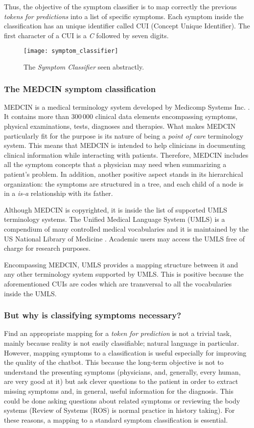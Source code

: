 Thus, the objective of the symptom classifier is to map correctly the previous \textit{tokens for predictions} into a list of specific symptoms. Each symptom inside the classification has an unique identifier called CUI (Concept Unique Identifier). The first character of a CUI is a \textit{C} followed by seven digits.

\begin{figure}[h]
\centering
\texttt{[image: symptom\_classifier]}
\caption{The \textit{Symptom Classifier} seen abstractly.}
\medskip
\end{figure}

\subsubsection{The MEDCIN symptom classification}
MEDCIN is a medical terminology system developed by Medicomp Systems Inc. \cite{medcin}. It contains more than $300\,000$ clinical data elements encompassing symptoms, physical examinations, tests, diagnoses and therapies. What makes MEDCIN particularly fit for the purpose is its nature of being a \textit{point of care} terminology system. This means that MEDCIN is intended to help clinicians in documenting clinical information while interacting with patients. Therefore, MEDCIN includes all the symptom concepts that a physician may need when summarizing a patient's problem. In addition, another positive aspect stands in its hierarchical organization: the symptoms are structured in a tree, and each child of a node is in a \textit{is-a} relationship with its father.

Although MEDCIN is copyrighted, it is inside the list of supported UMLS terminology systems. The Unified Medical Language System (UMLS) is a compendium of many controlled medical vocabularies and it is maintained by the US National Library of Medicine \cite{umls}. Academic users may access the UMLS free of charge for research purposes.

Encompassing MEDCIN, UMLS provides a mapping structure between it and any other terminology system supported by UMLS. This is positive because the aforementioned CUIs are codes which are transversal to all the vocabularies inside the UMLS.

\subsubsection{But why is  classifying symptoms necessary?}
Find an appropriate mapping for a \textit{token for prediction} is not a trivial task, mainly because reality is not easily classifiable; natural language in particular. However, mapping symptoms to a classification is useful especially for improving the quality of the chatbot. This because the long-term objective is not to understand the presenting symptoms (physicians, and, generally, every human, are very good at it) but ask clever questions to the patient in order to extract missing symptoms and, in general, useful information for the diagnosis. This could be done asking questions about related symptoms or reviewing the body systems (Review of Systems (ROS) is normal practice in history taking). For these reasons, a mapping to a standard symptom classification is essential.


